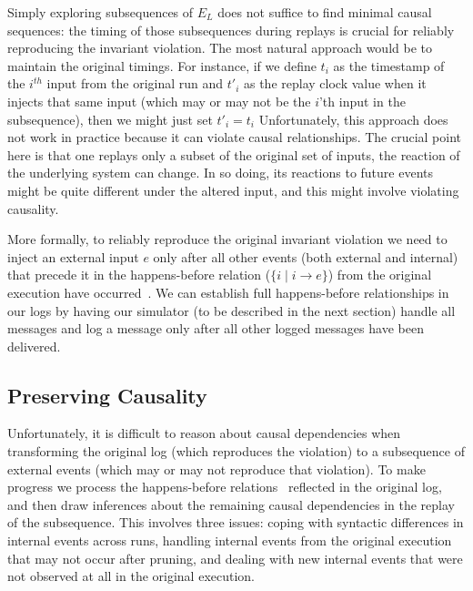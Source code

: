 Simply exploring subsequences of $E_L$ does not suffice to find
minimal causal sequences: the
timing of those subsequences during replays is crucial for reliably
reproducing the
invariant violation. The most natural approach would be to maintain the original
timings. For instance, if we
define $t_i$ as the timestamp of the $i^{th}$ input from the original run and $t'_i$ as the replay clock value when it injects that same input (which may or may not be the $i$'th input in the subsequence), then we might just set $t'_i = t_i$ 
Unfortunately, this approach does not work in practice because it can violate causal relationships. The crucial point here is that one replays only a subset of the original set of inputs, the reaction of the underlying system can change. In so doing, its reactions to future events might be quite different under the altered input, and this might involve violating causality.

More formally, to reliably reproduce the original invariant violation
we need to
inject an external input $e$ only after all other
events (both external and internal) that precede it in the happens-before
relation ($\{i \mid i \rightarrow e\}$) from the original execution have
occurred~\cite{tel2000introduction}. We can establish full happens-before relationships in our logs by having our simulator (to be described in the next section) handle all messages and log a message only after all other logged messages have been delivered. 

\subsection{Preserving Causality}

Unfortunately, it is difficult to reason about causal dependencies when transforming the original log
(which reproduces the violation) to a subsequence of external events
(which may or may not reproduce that violation).
To make progress we process the happens-before
relations~\cite{Lamport:1978:TCO:359545.359563} reflected in the original log,
and then draw inferences about
the remaining causal dependencies in the replay of the subsequence.
This involves three issues: coping with syntactic differences in internal
events across runs, handling internal events from the original
execution that may not occur after pruning, and dealing with new internal events that were not
observed at all in the original execution.

